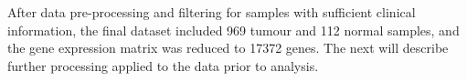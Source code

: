         
    After data pre-processing and filtering for samples with sufficient clinical information, the final dataset included 969 tumour and 112 normal samples, and  the gene expression matrix was reduced to 17372 genes. The next will describe further processing applied to the data prior to analysis. 
    
    

    







